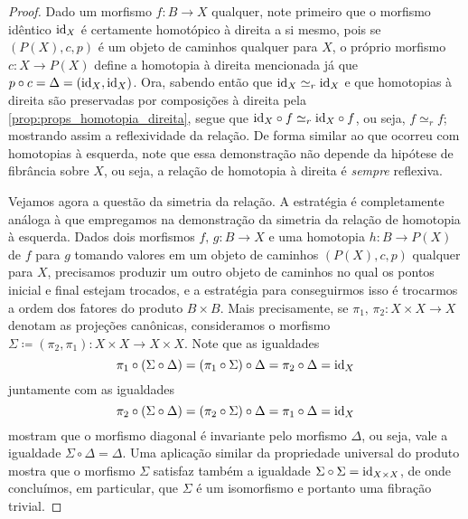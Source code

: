 \begin{proof}
  Dado um morfismo $f: B \to X$ qualquer, note primeiro que o morfismo idêntico $\mathrm{id}_{X}$ é certamente homotópico à direita a si mesmo, pois se $(P(X),c,p)$ é um objeto de caminhos qualquer para $X$, o próprio morfismo $c: X \to P(X)$ define a homotopia à direita mencionada já que $p \circ c = \Delta = (\mathrm{id}_{X},\mathrm{id}_{X})$.
  Ora, sabendo então que $\mathrm{id}_{X} \simeq_{r} \mathrm{id}_{X}$ e que homotopias à direita são preservadas por composições à direita pela \cref{prop:props_homotopia_direita}, segue que $\mathrm{id}_{X} \circ f \simeq_{r} \mathrm{id}_{X} \circ f$, ou seja, $f \simeq_{r} f$; mostrando assim a reflexividade da relação.
  De forma similar ao que ocorreu com homotopias à esquerda, note que essa demonstração não depende da hipótese de fibrância sobre $X$, ou seja, a relação de homotopia à direita é \emph{sempre} reflexiva.

  Vejamos agora a questão da simetria da relação.
  A estratégia é completamente análoga à que empregamos na demonstração da simetria da relação de homotopia à esquerda.
  Dados dois morfismos $f,\,g: B \to X$ e uma homotopia $h: B \to P(X)$ de $f$ para $g$ tomando valores em um objeto de caminhos $(P(X),c,p)$ qualquer para $X$, precisamos produzir um outro objeto de caminhos no qual os pontos inicial e final estejam trocados, e a estratégia para conseguirmos isso é trocarmos a ordem dos fatores do produto $B \times B$.
  Mais precisamente, se $\pi_{1},\, \pi_{2}: X \times X  \to X$ denotam as projeções canônicas, consideramos o morfismo $\Sigma \coloneqq (\pi_{2},\pi_{1}): X \times X \to X \times X$.
  Note que as igualdades
  \begin{displaymath}
    \pi_{1} \circ (\Sigma \circ \Delta) = (\pi_{1} \circ \Sigma) \circ \Delta = \pi_{2} \circ \Delta = \mathrm{id}_{X}
  \end{displaymath}
  juntamente com as igualdades
  \begin{displaymath}
    \pi_{2} \circ (\Sigma \circ \Delta) = (\pi_{2} \circ \Sigma) \circ \Delta = \pi_{1} \circ \Delta = \mathrm{id}_{X}
  \end{displaymath}
  mostram que o morfismo diagonal é invariante pelo morfismo $\Delta$, ou seja, vale a igualdade $\Sigma \circ \Delta = \Delta$.
  Uma aplicação similar da propriedade universal do produto mostra que o morfismo $\Sigma$ satisfaz também a igualdade $\Sigma \circ \Sigma = \mathrm{id}_{X \times X}$, de onde concluímos, em particular, que $\Sigma$ é um isomorfismo e portanto uma fibração trivial.


\end{proof}
